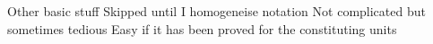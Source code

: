\documentclass[aspectratio=43]{beamer}
\begin{document}
\begin{frame}{Other basic stuff}
	Skipped until I homogeneise notation
	\vfill
	Not complicated but sometimes tedious
	\vfill
	Easy if it has been proved for the constituting units
\end{frame}









\end{document}
